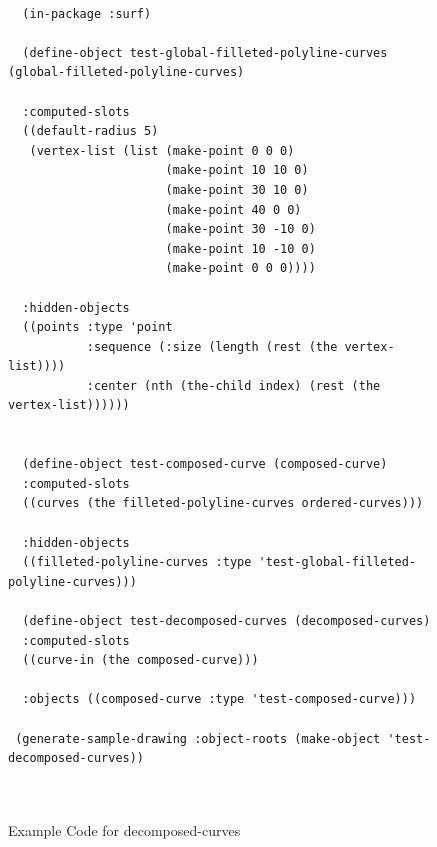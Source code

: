 \documentclass [11pt]{book}
\begin{document}
\begin{itemize}
\begin{description}
\end{description}




\begin{figure}
\begin{lrbox}{\boxedverb}
\begin{minipage}{\linewidth}
{\small

\begin{verbatim}
  
  (in-package :surf)  

  (define-object test-global-filleted-polyline-curves (global-filleted-polyline-curves)
                    
  :computed-slots
  ((default-radius 5)
   (vertex-list (list (make-point 0 0 0)
                      (make-point 10 10 0)
                      (make-point 30 10 0)
                      (make-point 40 0 0)
                      (make-point 30 -10 0)
                      (make-point 10 -10 0)
                      (make-point 0 0 0))))

  :hidden-objects
  ((points :type 'point
           :sequence (:size (length (rest (the vertex-list))))
           :center (nth (the-child index) (rest (the vertex-list))))))


  (define-object test-composed-curve (composed-curve)
  :computed-slots
  ((curves (the filleted-polyline-curves ordered-curves)))
  
  :hidden-objects
  ((filleted-polyline-curves :type 'test-global-filleted-polyline-curves)))

  (define-object test-decomposed-curves (decomposed-curves)
  :computed-slots
  ((curve-in (the composed-curve)))
  
  :objects ((composed-curve :type 'test-composed-curve)))

 (generate-sample-drawing :object-roots (make-object 'test-decomposed-curves))

 
\end{verbatim}}
\end{minipage}
\end{lrbox}
\fbox{\usebox{\boxedverb}}

\caption{Example Code for decomposed-curves}

\label{fig:example-code-decomposed-curves}

\end{figure}


\end{itemize}
\end{document}
